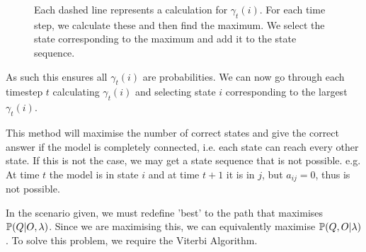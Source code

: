 \begin{figure}
\begin{center}
            \label{Hidden_Markov:Decoding:Figure_Gamma}
            \caption{Each dashed line represents a calculation for $\gamma_t(i)$. For each time step, we calculate these and then find the maximum. We select the state corresponding to the maximum and add it to the state sequence.}
        \end{center}
    \end{figure}
        
    As such this ensures all $\gamma_t(i)$ are probabilities. We can now go through each timestep $t$ calculating $\gamma_t(i)$ and selecting state $i$ corresponding to the largest $\gamma_t(i)$.


    This method will maximise the number of correct states and give the correct answer if the model is completely connected, i.e. each state can reach every other state. If this is not the case, we may get a state sequence that is not possible. e.g. At time $t$ the model is in state $i$ and at time $t+1$ it is in $j$, but $a_{ij} = 0$, thus is not possible.

    In the scenario given, we must redefine 'best' to the path that maximises $\mathbb{P} (Q | O, \lambda)$. Since we are maximising this, we can equivalently maximise $\mathbb{P} (Q, O | \lambda)$. To solve this problem, we require the Viterbi Algorithm.

